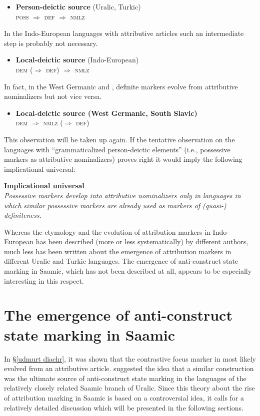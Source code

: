 {\begin{itemize}
\item \textbf{Person-deictic source} (Uralic, Turkic)\\
	\textsc{poss $\Rightarrow$ def $\Rightarrow$ nmlz}
\end{itemize}
In the Indo-European languages with attributive articles such an intermediate step is probably not necessary.
\begin{itemize}
\item \textbf{Local-deictic source} (Indo-European)\\
	\textsc{dem ($\Rightarrow$ def) $\Rightarrow$ nmlz}
\end{itemize}
In fact, in the West Germanic and , definite markers evolve from attributive nominalizers but not vice versa.
\begin{itemize}
\item \textbf{Local-deictic source (West Germanic, South Slavic)}\\
	\textsc{dem $\Rightarrow$ nmlz ($\Rightarrow$ def)}
\end{itemize}
This observation will be taken up again. If the tentative observation on the languages with “grammaticalized person-deictic elements” (i.e., possessive markers as attributive nominalizers) proves right it would imply the following implicational universal:
\begin{exe}
\label{universal}
\ex \rm{\textbf{Implicational universal}}\\
	\textit{Possessive markers develop into attributive nominalizers only in languages in which similar possessive markers are already used as markers of (quasi-) definiteness.}
\end{exe}
Whereas the etymology and the evolution of attribution markers in Indo\hyp{}European has been described (more or less systematically) by different authors, much less has been written about the emergence of attribution markers in different Uralic and Turkic languages. The emergence of anti\hyp{}construct state marking in Saamic, which has not been described at all, appears to be especially interesting in this respect.

\section[Anti\hyp{}construct state in Saamic]{The emergence of anti\hyp{}construct state marking in Saamic} \label{saamic diachr}
In \S\ref{udmurt diachr}, it was shown that the contrastive focus marker in  most likely evolved from an attributive article. \cite{riesler2006b} suggested the idea that a similar construction was the ultimate source of anti\hyp{}construct state marking in the languages of the relatively closely related Saamic branch of Uralic. Since this theory about the rise of attribution marking in Saamic is based on a controversial idea, it calls for a relatively detailed discussion which will be presented in the following sections.

}
